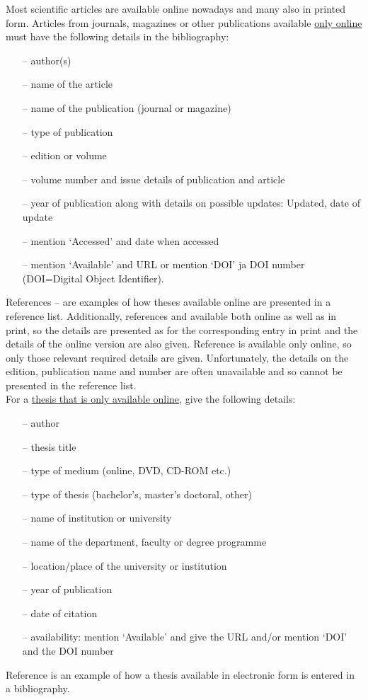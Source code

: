 \documentclass[english, 12pt, a4paper, biz, utf8, a-2b, online]{aaltothesis}
\begin{document}
Most scientific articles are available online nowadays and many also in printed 
form. Articles from journals, magazines or other publications available 
\underline{only online} must have the following details in the bibliography:
\begin{itemize}
\setlength{\itemsep}{-3pt}
\item[--]author(s)
\item[--]name of the article
\item[--]name of the publication (journal or magazine)
\item[--]type of publication
\item[--]edition or volume
\item[--]volume number and issue details of publication and article
\item[--]year of publication along with details on possible updates: Updated, 
date of update
\item[--]mention `Accessed' and date when accessed
\item[--]mention `Available' and URL or mention `DOI' ja DOI number (DOI=Digital
Object Identifier).
\end{itemize}
References \cite{Ribeiro}--\cite{kone} are examples of how theses available 
online are presented in a reference list. Additionally, references 
\cite{Ribeiro} and \cite{Stieber} available both online as well as in print, so 
the details are presented as for the corresponding entry in print and the 
details of the online version are also given. Reference \cite{kone} is 
available only online, so only those relevant required details are given.
Unfortunately, the details on the edition, publication name and number are 
often unavailable and so cannot be presented in the reference list.\\

\noindent
For a \underline{thesis that is only available online}, give the following 
details:
\begin{itemize}
\setlength{\itemsep}{-3pt}
\item[--]author
\item[--]thesis title
\item[--]type of medium (online, DVD, CD-ROM etc.)
\item[--]type of thesis (bachelor's, master's doctoral, other)
\item[--]name of institution or university
\item[--]name of the department, faculty or degree programme
\item[--]location/place of the university or institution
\item[--]year of publication
\item[--]date of citation
\item[--]availability: mention `Available' and give the URL and/or mention `DOI'
and the DOI number
\end{itemize}
Reference \cite{Adida} is an example of how a thesis available in electronic 
form is entered in a bibliography.\\
\end{document}
